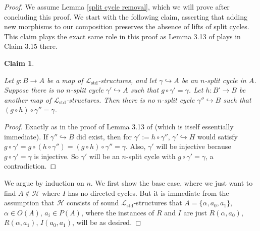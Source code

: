 \documentclass{amsart}
\newtheorem{claim}[theorem]{Claim}
\theoremstyle{definition}
\theoremstyle{remark}
\numberwithin{equation}{section}
\begin{document}
\begin{proof}
    We assume Lemma \ref{split cycle removal}, which we will prove after concluding this proof.  We start with the following claim, asserting that adding new morphisms to our composition preserves the absence of lifts of split cycles. This claim plays the exact same role in this proof as Lemma 3.13 of \cite{ApproxOrder} plays in Claim 3.15 there.

    
    
\begin{claim}\label{pulling back does not add split cycles}

Let $g: B \to A$ be a map of $\mathcal{L}_{\mathrm{std}}$-structures, and let $\gamma \hookrightarrow A$ be an $n$-split cycle in $A$. Suppose there is no $n$-split cycle $\gamma' \hookrightarrow A$ such that $g \circ \gamma' = \gamma$. Let $h: B' \to B$ be another map of $\mathcal{L}_{\mathrm{std}}$-structures. Then there is no $n$-split cycle $\gamma'' \hookrightarrow  B$ such that $(g \circ h) \circ \gamma'' = \gamma$.

    
\end{claim}


\begin{proof}
    Exactly as in the proof of Lemma 3.13 of \cite{ApproxOrder} (which is itself essentially immediate). If $\gamma'' \hookrightarrow B$ did exist, then for $\gamma' := h \circ \gamma''$, $\gamma' \hookrightarrow H$ would satisfy $g \circ \gamma'= g \circ ( h \circ \gamma'')  = (g \circ h) \circ \gamma'' = \gamma$. Also, $\gamma'$ will be injective because $g \circ \gamma' =\gamma$ is injective. So $\gamma'$ will be an $n$-split cycle with $g \circ \gamma' =\gamma$, a contradiction.
\end{proof}

We argue by induction on $n$. We first show the base case, where we just want to find $A \notin \mathcal{H}$ where $I$ has no directed cycles. But it is immediate from the assumption that $\mathcal{H}$ consists of sound $\mathcal{L}_{\mathrm{std}}$-structures that $A = \{\alpha, a_0, a_1\}$, $\alpha \in O(A)$, $a_i \in P(A)$, where the instances of $R$ and $I$ are just $R(\alpha, a_0)$, $R(\alpha, a_1)$, $I(a_0, a_1)$, will be as desired.


\end{proof}
\end{document}
